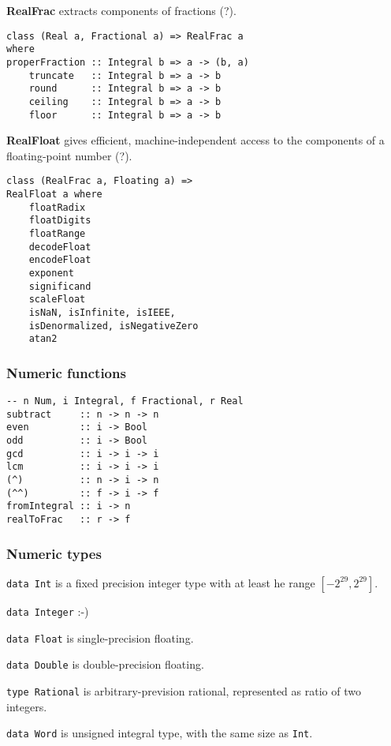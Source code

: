 \textbf{RealFrac} extracts components of fractions (?).
\begin{verbatim}
class (Real a, Fractional a) => RealFrac a
where
properFraction :: Integral b => a -> (b, a)
    truncate   :: Integral b => a -> b
    round      :: Integral b => a -> b
    ceiling    :: Integral b => a -> b
    floor      :: Integral b => a -> b
\end{verbatim}

\textbf{RealFloat} gives efficient, machine-independent access to the components of a floating-point number (?).
\begin{verbatim}
class (RealFrac a, Floating a) =>
RealFloat a where
    floatRadix
    floatDigits
    floatRange
    decodeFloat
    encodeFloat
    exponent
    significand
    scaleFloat
    isNaN, isInfinite, isIEEE,
    isDenormalized, isNegativeZero
    atan2
\end{verbatim}

\subsubsection{Numeric functions}
\begin{verbatim}
-- n Num, i Integral, f Fractional, r Real
subtract     :: n -> n -> n
even         :: i -> Bool
odd          :: i -> Bool
gcd          :: i -> i -> i
lcm          :: i -> i -> i
(^)          :: n -> i -> n
(^^)         :: f -> i -> f
fromIntegral :: i -> n
realToFrac   :: r -> f
\end{verbatim}

\subsubsection{Numeric types}
\texttt{data Int} is a fixed precision integer type with at least he range $[-2^{29}, 2^{29}]$.

\texttt{data Integer} :-)

\texttt{data Float} is single-precision floating.

\texttt{data Double} is double-precision floating.

\texttt{type Rational} is arbitrary-prevision rational, represented as ratio of two integers.

\texttt{data Word} is unsigned integral type, with the same size as \texttt{Int}.

%